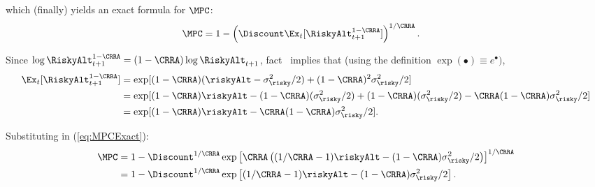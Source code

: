 which (finally) yields an exact formula for $\MPC$:
\begin{equation}\begin{gathered}\begin{aligned}
  \MPC & =  1- \left(\Discount  \Ex_{t}[\RiskyAlt_{t+1}^{1-\CRRA}]\right)^{1/\CRRA} \label{eq:MPCExact}.
\end{aligned}\end{gathered}\end{equation}


Since $\log \RiskyAlt_{t+1}^{1-\CRRA} = (1-\CRRA) \log \RiskyAlt_{t+1}$, fact \ELogNormTimes~implies that (using the definition $\exp(\bullet) \equiv e^{\bullet})$,
\begin{equation}\begin{gathered}\begin{aligned}
  \Ex_{t}[\RiskyAlt_{t+1}^{1-\CRRA}] & =  \exp[(1-\CRRA) ({\riskyAlt} -\sigma_{\risky}^{2}/2)+ (1-\CRRA)^{2} \sigma_{\risky}^{2} /2] \label{eq:ERportToTheOneMinusRho}
\\ & =  \exp[(1-\CRRA) {\riskyAlt} -(1-\CRRA)(\sigma_{\risky}^{2}/2)  + (1-\CRRA)(\sigma^{2}_{\risky}/2)  - \CRRA(1-\CRRA)\sigma_{\risky}^{2}/2] \notag \\
 & =  \exp[(1-\CRRA) {\riskyAlt} - \CRRA(1-\CRRA)\sigma_{\risky}^{2}/2].
\end{aligned}\end{gathered}\end{equation}

Substituting in (\ref{eq:MPCExact}):
\begin{equation}\begin{gathered}\begin{aligned}
\MPC & =  1- \Discount ^{1/\CRRA} \exp\left[\CRRA\left((1/\CRRA - 1){\riskyAlt} - (1-\CRRA)\sigma_{\risky}^{2}/2\right)\right]^{1/\CRRA} \notag
\\ & =  1- \Discount ^{1/\CRRA} \exp\left[(1/\CRRA - 1){\riskyAlt} - (1-\CRRA)\sigma_{\risky}^{2}/2\right] \label{eq:newgam}
.
\end{aligned}\end{gathered}\end{equation}


